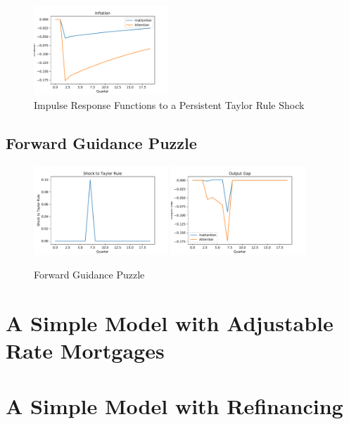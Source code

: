 \documentclass[AER]{AEA}
\begin{document}
\begin{figure}
	\includegraphics[width=0.45\textwidth]{../Figures/inflation.pdf}
	\caption{Impulse Response Functions to a Persistent Taylor Rule Shock}
	\label{fig:ImpulseResponse}
\end{figure}
\subsection{Forward Guidance Puzzle}
\begin{figure}
	\includegraphics[width=0.45\textwidth]{../Figures/shock_fwd_guid.pdf}
	\includegraphics[width=0.45\textwidth]{../Figures/output_fwd_guid.pdf}
	\caption{Forward Guidance Puzzle}
	\label{fig:FwdGuidance}
\end{figure}



\section{A Simple Model with Adjustable Rate Mortgages}


\section{A Simple Model with Refinancing}




\appendix
\end{document}
